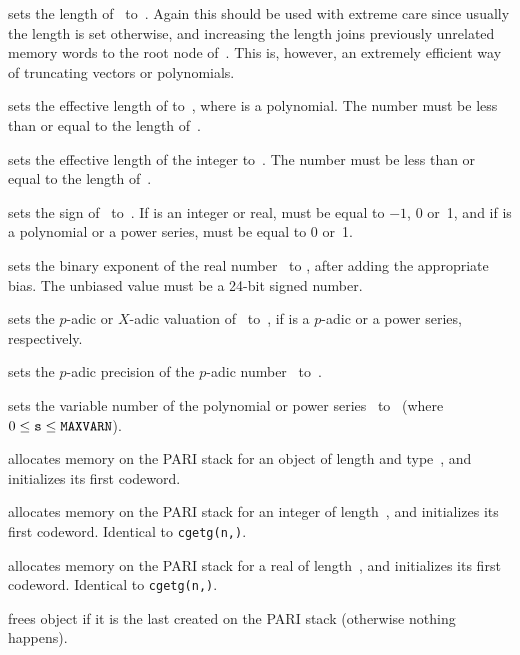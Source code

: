  sets the length of~ to~. Again
this should be used with extreme care since usually the length is set
otherwise, and increasing the length joins previously unrelated memory words
to the root node of~. This is, however, an extremely efficient way of
truncating vectors or polynomials.

 sets the effective length of 
to~, where  is a polynomial. The number  must be less
than or equal to the length of~.

 sets the effective length
of the integer  to~. The number  must be less than or
equal to the length of~.

 sets the sign of~ to~.
If  is an integer or real,  must be equal to $-1$, 0 or~1,
and if  is a polynomial or a power series,  must be equal to
0 or~1.

 sets the binary exponent of the real
number~ to , after adding the appropriate bias. The unbiased
value  must be a 24-bit signed number.

 sets the $p$-adic or $X$-adic valuation
of~ to~, if  is a $p$-adic or a power series,
respectively.

 sets the $p$-adic precision of the
$p$-adic number~ to~.

 sets the variable number of the polynomial
or power series~ to~ (where $0\le {\tt s}\le{\tt MAXVARN}$).



 allocates memory on the PARI stack for
an object of length  and type~, and initializes its first
codeword.

 allocates memory on the PARI stack for an
integer of length~, and initializes its first codeword. Identical to
{\tt cgetg(n,)}.

 allocates memory on the PARI stack for a real
of length~, and initializes its first codeword. Identical to
{\tt cgetg(n,)}.

 frees object  if it is the last created on the
PARI stack (otherwise nothing happens).

